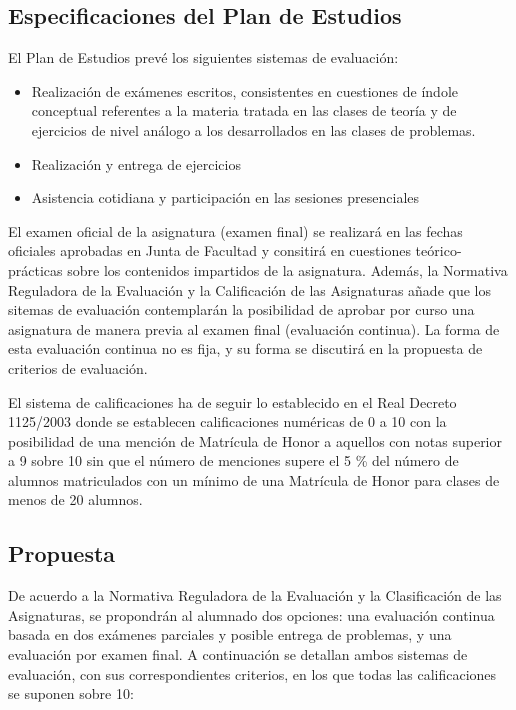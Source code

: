 \documentclass[a4paper,12pt,twoside]{article}
\begin{document}
\subsection{Especificaciones del Plan de Estudios}

El Plan de Estudios prevé los siguientes sistemas de evaluación:

\begin{itemize}
\item Realización de exámenes escritos, consistentes en cuestiones de índole conceptual referentes a la materia tratada en las clases de teoría y de ejercicios de nivel análogo a los desarrollados en las clases de problemas.

\item Realización y entrega de ejercicios

\item Asistencia cotidiana y participación en las sesiones presenciales
\end{itemize}


El examen oficial de la asignatura (examen final) se realizará en las fechas oficiales aprobadas en Junta de Facultad y consitirá en cuestiones teórico-prácticas sobre los contenidos impartidos de la asignatura. Además, la Normativa Reguladora de la Evaluación y la Calificación de las Asignaturas añade que los sitemas de evaluación contemplarán la posibilidad de aprobar por curso una asignatura de manera previa al examen final (evaluación continua). La forma de esta evaluación continua no es fija, y su forma se discutirá en la propuesta de criterios de evaluación.

El sistema de calificaciones ha de seguir lo establecido en el Real Decreto 1125/2003 donde se establecen calificaciones numéricas de 0 a 10 con la posibilidad de una mención de Matrícula de Honor a aquellos con notas superior a 9 sobre 10 sin que el número de menciones
supere el 5 \% del número de alumnos matriculados con un mínimo de una Matrícula de Honor para clases de menos de 20 alumnos.

\subsection{Propuesta}

De acuerdo a la Normativa Reguladora de la Evaluación y la Clasificación de las Asignaturas, se propondrán al alumnado dos opciones: una evaluación continua basada en dos exámenes parciales y posible entrega de problemas, y una evaluación por examen final. A continuación se detallan ambos sistemas de evaluación, con sus correspondientes criterios, en los que todas las calificaciones se suponen sobre 10:
\end{document}
